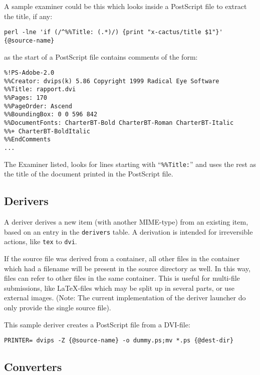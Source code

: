 A sample examiner could be this which looks inside a PostScript file
to extract the title, if any:

\begin{verbatim}
perl -lne 'if (/^%%Title: (.*)/) {print "x-cactus/title $1"}' {@source-name}
\end{verbatim}

as the start of a PostScript file contains comments of the form:

\begin{verbatim}
%!PS-Adobe-2.0
%%Creator: dvips(k) 5.86 Copyright 1999 Radical Eye Software
%%Title: rapport.dvi
%%Pages: 170
%%PageOrder: Ascend
%%BoundingBox: 0 0 596 842
%%DocumentFonts: CharterBT-Bold CharterBT-Roman CharterBT-Italic
%%+ CharterBT-BoldItalic
%%EndComments
...
\end{verbatim}

The Examiner listed, looks for lines starting with
``\texttt{\%\%Title:}'' and uses the rest as the title of the document
printed in the PostScript file.

\subsection{Derivers}

A deriver derives a new item (with another MIME-type) from
an existing item, based on an entry in the \texttt{derivers}
table.  A derivation is intended for irreversible actions, like
\texttt{tex} to \texttt{dvi}.

If the source file was derived from a container, all other files in
the container which had a filename will be present in the source
directory as well.  In this way, files can refer to other files in the
same container.  This is useful for multi-file submissions, like
{\LaTeX}-files which may be split up in several parts, or use external
images.  (Note:  The current implementation of the deriver launcher do
only provide the single source file).

This sample deriver creates a PostScript file from a DVI-file:

\begin{verbatim}
PRINTER= dvips -Z {@source-name} -o dummy.ps;mv *.ps {@dest-dir}
\end{verbatim}



\subsection{Converters}

